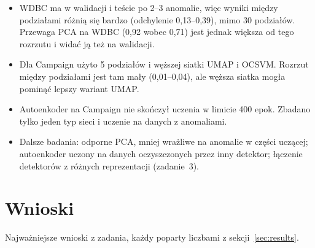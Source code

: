\documentclass[11pt,a4paper]{article}
\begin{document}
\begin{itemize}
  \item WDBC ma w walidacji i teście po 2--3 anomalie, więc wyniki między
  podziałami różnią się bardzo (odchylenie 0,13--0,39), mimo 30 podziałów.
  Przewaga PCA na WDBC (0,92 wobec 0,71) jest jednak większa od tego rozrzutu
  i widać ją też na walidacji.
  \item Dla Campaign użyto 5 podziałów i węższej siatki UMAP i OCSVM.
  Rozrzut między podziałami jest tam mały (0,01--0,04), ale węższa siatka mogła
  pominąć lepszy wariant UMAP.
  \item Autoenkoder na Campaign nie skończył uczenia w limicie 400 epok.
  Zbadano tylko jeden typ sieci i uczenie na danych z anomaliami.
  \item Dalsze badania: odporne PCA, mniej wrażliwe na anomalie w części
  uczącej; autoenkoder uczony na danych oczyszczonych przez inny detektor;
  łączenie detektorów z różnych reprezentacji (zadanie~3).
\end{itemize}

\FloatBarrier
\section{Wnioski}

Najważniejsze wnioski z zadania, każdy poparty liczbami z
sekcji~\ref{sec:results}.
\end{document}
